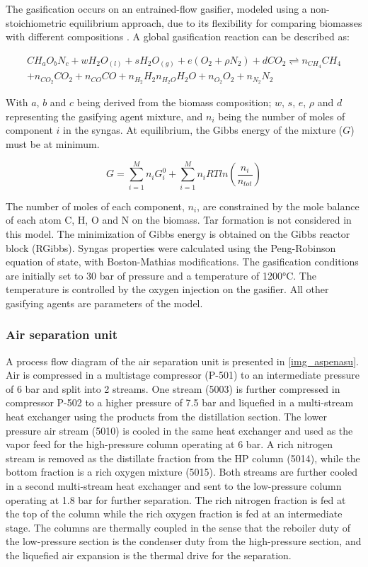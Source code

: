 \documentclass[a4paper, titlepage]{article}
\begin{document}
The gasification occurs on an entrained-flow gasifier, modeled using a non-stoichiometric equilibrium approach, 
due to its flexibility for comparing biomasses with different compositions 
\cite{gambarottaNonstoichiometricEquilibriumModel2018}. A global gasification reaction can be described as:

\begin{multline}
	CH_aO_bN_c + wH_2O_{(l)} + sH_2O_{(g)} + e(O_2+\rho N_2) + dCO_2 \rightleftharpoons n_{CH_4}CH_4 \\ 
	+ n_{CO_2}CO_2 + n_{CO}CO + n_{H_2}H_2 n_{H_2O}H_2O + n_{O_2}O_2 + n_{N_2}N_2
\end{multline}

With $a$, $b$ and $c$ being derived from the biomass composition; $w$, $s$, $e$, $\rho$ and $d$ representing the
gasifying agent mixture, and $n_i$ being the number of moles of component $i$ in the syngas. At equilibrium, the Gibbs
energy of the mixture ($G$) must be at minimum.

\begin{equation}
	G = \sum_{i=1}^{M}{n_iG_i^0} + \sum_{i=1}^{M}{n_iRT ln \left( \frac{n_i}{n_{tot}} \right) }
\end{equation}

The number of moles of each component, $n_i$, are constrained by the mole balance of each atom C, H, O and N on the
biomass. Tar formation is not considered in this model. The minimization of Gibbs energy is obtained on the Gibbs 
reactor block (RGibbs). Syngas properties were calculated using the Peng-Robinson equation of state, 
with Boston-Mathias modifications. The gasification conditions are initially set to 30 bar of pressure and a 
temperature of 1200°C.  The temperature is controlled by the oxygen injection on the gasifier. All other gasifying 
agents are parameters of the model.

\subsubsection{Air separation unit}

A process flow diagram of the air separation unit is presented in \autoref{img_aspenasu}. 
Air is compressed in a multistage compressor (P-501) to an intermediate pressure of 6 bar and split into 2 streams. 
One stream (5003) is further compressed in compressor P-502 to a higher pressure of 7.5 bar and liquefied in a 
multi-stream heat exchanger using the products from the distillation section. 
The lower pressure air stream (5010) is cooled in the same heat exchanger and used as the vapor feed for the 
high-pressure column operating at 6 bar.
A rich nitrogen stream is removed as the distillate fraction from the HP column (5014), while the bottom fraction is 
a rich oxygen mixture (5015). 
Both streams are further cooled in a second multi-stream heat exchanger and sent to the low-pressure column operating
at 1.8 bar for further separation. The rich nitrogen fraction is fed at the top of the column while the rich oxygen 
fraction is fed at an intermediate stage. The columns are thermally coupled in the sense that the reboiler duty of the
low-pressure section is the condenser duty from the high-pressure section, and the liquefied air expansion is the 
thermal drive for the separation.
\end{document}
